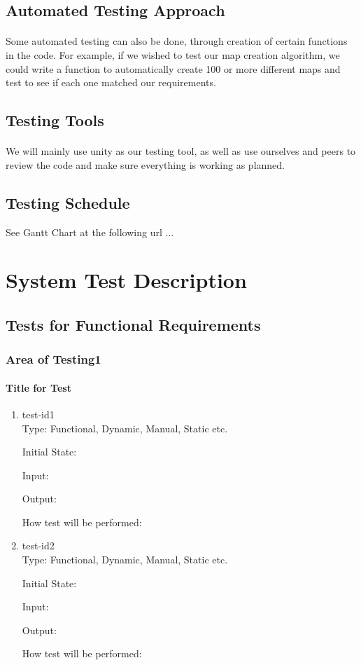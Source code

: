 \documentclass[12pt, titlepage]{article}
\begin{document}
\subsection{Automated Testing Approach}
\paragraph{}Some automated testing can also be done, through creation of certain functions in the code. For example, if we wished to test our map creation algorithm, we could write a function to automatically create 100 or more different maps and test to see if each one matched our requirements. 
\subsection{Testing Tools}
\paragraph{}We will mainly use unity as our testing tool, as well as use ourselves and peers to review the code and make sure everything is working as planned.
\subsection{Testing Schedule}
		
See Gantt Chart at the following url ...
\section{System Test Description}
	
\subsection{Tests for Functional Requirements}
\subsubsection{Area of Testing1}
		
\paragraph{Title for Test}
\begin{enumerate}
\item{test-id1\\}
Type: Functional, Dynamic, Manual, Static etc.
					
Initial State: 
					
Input: 
					
Output: 
					
How test will be performed: 
					
\item{test-id2\\}
Type: Functional, Dynamic, Manual, Static etc.
					
Initial State: 
					
Input: 
					
Output: 
					
How test will be performed: 
\end{enumerate}
\end{document}
